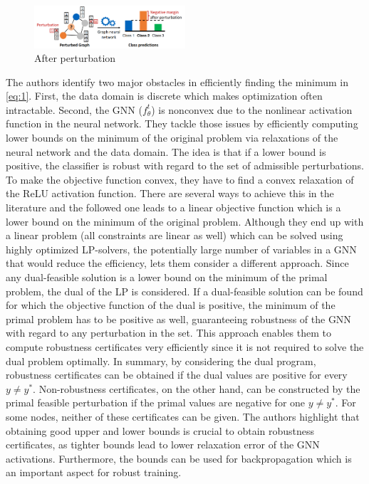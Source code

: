 \documentclass[a4paper,preprint]{sig-alternate}
\begin{document}
\begin{figure}[h]
    \centering
    \includegraphics[width=0.5\textwidth]{img/after_pert.png}
    \caption{After perturbation \cite{Zuegner_2019}}
    \label{fig:after_pert}
\end{figure}

The authors identify two major obstacles in efficiently finding the minimum in \ref{eq:1}.
First, the data domain is discrete which makes optimization often intractable. Second, the GNN ($f_{\theta}^t$) is nonconvex
due to the nonlinear activation function in the neural network. They tackle those issues by efficiently computing lower bounds
on the minimum of the original problem via relaxations of the neural network and the data domain.
The idea is that if a lower bound is positive, the classifier is robust with regard to the set of admissible perturbations.
To make the objective function convex, they have to find a convex relaxation of the ReLU activation function. There are several ways to achieve this in the literature and the followed one leads to a linear objective function which is a lower bound on the minimum of the original problem.
Although they end up with a linear problem (all constraints are linear as well) which can be solved using highly optimized LP-solvers,
the potentially large number of variables in a GNN that would reduce the efficiency, lets them consider a different approach.
Since any dual-feasible solution is a lower bound on the minimum of the primal problem, the dual of the LP is considered.
If a dual-feasible solution can be found for which the objective function of the dual is positive, the minimum
of the primal problem has to be positive as well, guaranteeing robustness of the GNN with regard to any perturbation in the set.
This approach enables them to compute robustness certificates very efficiently since it is not required to solve the dual problem optimally.\newline
In summary, by considering the dual program, robustness certificates can be obtained if the dual values are positive for every $y \neq y^*$.
Non-robustness certificates, on the other hand, can be constructed by the primal feasible perturbation if the primal values are negative for
one $y \neq y^*$. For some nodes, neither of these certificates can be given. The authors highlight that obtaining good upper and lower bounds is 
crucial to obtain robustness certificates, as tighter bounds lead to lower relaxation error of the GNN activations. Furthermore, the bounds can 
be used for backpropagation which is an important aspect for robust training.\newline
\end{document}
